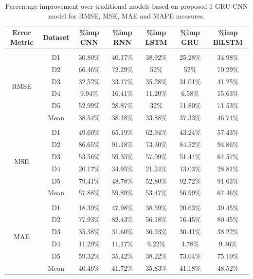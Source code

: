 \documentclass[a4paper, fleqn]{cas-sc}
\begin{document}
\begin{table}[!h]
    \centering
    \caption{Percentage improvement over traditional models based on proposed-1 GRU-CNN model for RMSE,  MSE,  MAE and MAPE measures.}
    \label{tab:error_metrics}
    \begin{tabular}{ccccccc}
        \toprule
        Error Metric & Dataset & \%imp CNN & \%imp RNN & \%imp LSTM & 
        \%imp GRU & \%imp BiLSTM \\
        \midrule
        \multirow{7}{*}{RMSE} \\
        & D1 & 30.80\% & 40.17\% & 38.92\% & 25.28\% & 34.98\% \\
        & D2 & 66.46\% & 72.29\% & 52\% & 52\% & 70.29\% \\
        & D3 & 32.52\% & 33.17\% & 35.28\% & 31.01\% & 41.25\% \\
        & D4 & 9.94\% & 16.41\% & 11.20\% & 6.58\% & 15.63\%\\
        & D5 & 52.99\% & 28.87\% & 32\% & 71.80\% & 71.53\%\\
        & Mean & 38.54\% & 38.18\% & 33.88\% & 37.33\% & 46.74\%\\
        \midrule
        \multirow{7}{*}{MSE}\\
        & D1 & 49.60\% & 65.19\% & 62.94\% & 43.24\% & 57.43\%\\
        & D2 & 86.65\% & 91.18\% & 73.30\% & 84.52\% & 94.86\%\\
        & D3 & 53.56\%  & 59.35\% & 57.09\% & 51.44\% & 64.57\%\\
        & D4 & 20.17\% & 34.95\% & 21.24\% & 13.03\% & 28.81\%\\
        & D5 & 79.41\% & 48.78\% & 52.80\% & 92.72\% & 91.63\%\\
        & Mean & 57.88\% & 59.89\% & 53.47\% & 56.99\% & 67.46\%\\
        \midrule
        \multirow{7}{*}{MAE}\\
        & D1 & 18.39\% & 47.98\% & 38.59\% & 20.63\% & 39.45\%\\
        & D2 & 77.93\% & 82.43\% & 56.18\% & 76.45\% & 80.45\%\\
        & D3 & 35.38\% & 31.60\% & 36.93\% & 30.41\% & 38.22\%\\
        & D4 & 11.29\% & 11.17\% & 9.22\% & 4.78\% & 9.36\%\\
        & D5  & 59.32\% & 35.42\% & 38.22\% & 73.64\% & 75.10\%\\
        & Mean & 40.46\% & 41.72\% & 35.83\% & 41.18\% & 48.52\%\\

\end{tabular}
\end{table}
\end{document}
